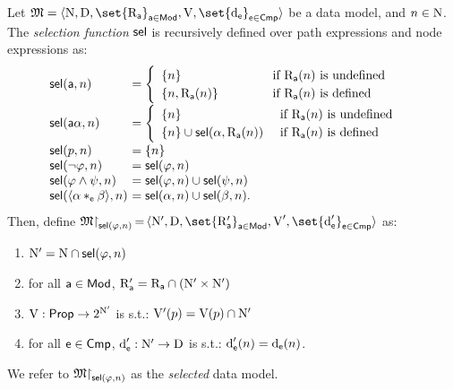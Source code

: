 \begin{definition}
    \label{def:selection}
    Let  $\model = \tup{ \N, \D, \set{\R_{\apath}}_{\apath \in \mods}, \valuation,\set{\data_\cmp}_{\cmp \in \cmps} }$ be a data model, and $n\in\mathrm{N}$. The \emph{selection function} $\operatorname{\mathsf{sel}}$ is recursively defined over path expressions and node expressions as:
    \[
    \begin{array}{@{\ }l@{\ }l}
        \sel(\apath,n) & = \begin{cases}
            \begin{array}{l@{\quad\quad\quad\quad}l}
                \{n\}  & \text{\ if $\R_{\apath}(n)$ is undefined}\\
                \{n,\R_\apath(n)\} & \text{\ if $\R_{\apath}(n)$ is defined} 
            \end{array}
            \end{cases} 
            \\[10pt] 
        \sel(\apath\alpha,n) & = \begin{cases}
            \begin{array}{ll}
                \{n\} & \text{\ if $\R_{\apath}(n)$ is undefined} \\
                \{n\} \cup \sel(\alpha,\R_\apath(n)) & \text{\ if $\R_{\apath}(n)$ is defined}
            \end{array}
            \end{cases}
            \\[10pt] 
        \sel(p,n) & = \{n\} \\
        \sel(\neg\varphi,n) & = \sel(\varphi,n) \\
        \sel(\varphi\land\psi,n) & = \sel(\varphi,n) \cup \sel(\psi,n) \\
        \sel(\tup{\alpha *_{\cmp}\beta},n) & = \sel(\alpha,n) \cup \sel(\beta,n).
    \end{array}
    \]
    \noindent
    Then, define $\model{\restriction}_{\sel(\varphi,n)}\,{=}\,\tup{ \N', \D, \set{\R'_{\apath}}_{\apath \in \mods}, \valuation',\set{\data'_\cmp}_{\cmp \in \cmps} }$ as:
    \begin{enumerate}
        \item 
            $\mathrm{N}' = \mathrm{N} \cap \operatorname{\mathsf{sel}}(\varphi,n)$
        \item 
            for all $\mathsf{a} \in \mathsf{Mod}$, $\mathrm{R}'_{\mathsf{a}} = \mathrm{R}_{\mathsf{a}} \cap (\mathrm{N}' \times \mathrm{N}')$
        \item $\operatorname{V}: \mathsf{Prop} \to 2^{\mathrm{N}'}$ is s.t.:
            $\mathrm{V}'(p) = \mathrm{V}(p) \cap \mathrm{N}'$
        \item 
        for all $\mathsf{e} \in \mathsf{Cmp}$, $\operatorname{d}'_{\mathsf{e}}:  \mathrm{N}' \to \mathrm{D}$ is s.t.: $\operatorname{d}'_{\mathsf{e}}(n) = \operatorname{d}_{\mathsf{e}}(n)$.
    \end{enumerate}
    We refer to $\mathfrak{M}{\restriction}_{\operatorname{\mathsf{sel}}(\varphi,n)}$ as the \emph{selected} data model.
\end{definition}

